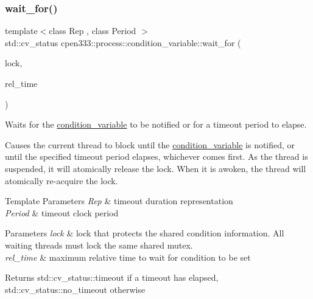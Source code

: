 \subsubsection{\texorpdfstring{wait\+\_\+for()}{wait\_for()}\hspace{0.1cm}{\footnotesize\ttfamily [1/2]}}
{\footnotesize\ttfamily template$<$class Rep , class Period $>$ \\
std\+::cv\+\_\+status cpen333\+::process\+::condition\+\_\+variable\+::wait\+\_\+for (\begin{DoxyParamCaption}\item[{std\+::unique\+\_\+lock$<$ \hyperlink{classcpen333_1_1process_1_1mutex}{cpen333\+::process\+::mutex} $>$ \&}]{lock,  }\item[{const std\+::chrono\+::duration$<$ Rep, Period $>$ \&}]{rel\+\_\+time }\end{DoxyParamCaption})\hspace{0.3cm}{\ttfamily [inline]}}



Waits for the \hyperlink{classcpen333_1_1process_1_1condition__variable}{condition\+\_\+variable} to be notified or for a timeout period to elapse. 

Causes the current thread to block until the \hyperlink{classcpen333_1_1process_1_1condition__variable}{condition\+\_\+variable} is notified, or until the specified timeout period elapses, whichever comes first. As the thread is suspended, it will atomically release the lock. When it is awoken, the thread will atomically re-\/acquire the lock.


\begin{DoxyTemplParams}{Template Parameters}
{\em Rep} & timeout duration representation \\
\hline
{\em Period} & timeout clock period \\
\hline
\end{DoxyTemplParams}

\begin{DoxyParams}{Parameters}
{\em lock} & lock that protects the shared condition information. All waiting threads must lock the same shared mutex. \\
\hline
{\em rel\+\_\+time} & maximum relative time to wait for condition to be set \\
\hline
\end{DoxyParams}
\begin{DoxyReturn}{Returns}
std\+::cv\+\_\+status\+::timeout if a timeout has elapsed, std\+::cv\+\_\+status\+::no\+\_\+timeout otherwise 
\end{DoxyReturn}
\mbox{\label{classcpen333_1_1process_1_1condition__variable_af610e3f28f9c5ea4c24b35cca125ff45}} 
